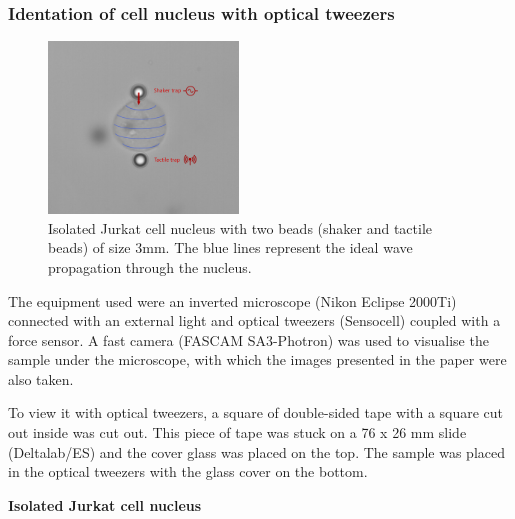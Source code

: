 \documentclass[12pt, a4paper]{article} %
\begin{document}
\setlength{\parskip}{0mm}

\subsubsection{Identation of cell nucleus with optical tweezers}

\begin{figure}
	\centering
	\includegraphics[width=0.45\textwidth]{figures/jurkat_nucleus_waves.png}
	\caption{Isolated Jurkat cell nucleus with two beads (shaker and tactile beads) of size 3mm. The blue lines represent the ideal wave propagation through the nucleus.}
	\label{fig:myfig2}
\end{figure}

The equipment used were an inverted microscope (Nikon Eclipse 2000Ti) connected with an external light and optical tweezers (Sensocell) coupled with a force sensor. A fast camera (FASCAM SA3-Photron) was used to visualise the sample under the microscope, with which the images presented in the paper were also taken.

\setlength{\parskip}{4mm}

To view it with optical tweezers, a square of double-sided tape with a square cut out inside was cut out. This piece of tape was stuck on a 76 x 26 mm slide (Deltalab/ES) and the cover glass was placed on the top. The sample was placed in the optical tweezers with the glass cover on the bottom.

\setlength{\parindent}{0pt}

\newpage

{\textbf{Isolated Jurkat cell nucleus}}
\end{document}
